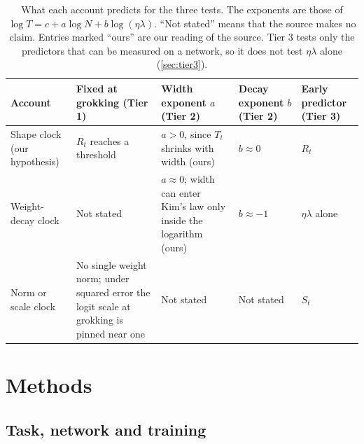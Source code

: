 \documentclass[a4paper,11pt]{article} %
\begin{document}
\begin{table}[H]
  \centering\small
  \caption{What each account predicts for the three tests. The exponents are
    those of $\log T = c + a\log N + b\log(\eta\lambda)$. \enquote{Not
    stated} means
    that the source makes no claim. Entries marked \enquote{ours} are
    our reading of
    the source. Tier 3 tests only the predictors that can be measured on a
  network, so it does not test $\eta\lambda$ alone (\cref{sec:tier3}).}
  \label{tab:predictions}
  \begin{tabular}{L{2.6cm}L{3.3cm}L{2.5cm}L{1.6cm}L{2.1cm}}
    \toprule
    Account & Fixed at grokking (Tier 1) & Width exponent $a$ (Tier 2) &
    Decay exponent $b$ (Tier 2) & Early predictor (Tier 3) \\
    \midrule
    Shape clock (our hypothesis) & $R_t$ reaches a threshold &
    $a>0$, since $T_t$ shrinks with width (ours) & $b\approx0$ & $R_t$ \\
    Weight-decay clock
    \citep{kimGrokkingWeightDecayClock2026,pracherSpectralTheoryGrokking2026,liuOmnigrokGrokkingAlgorithmic2023}
    &
    Not stated & $a\approx0$; width can enter Kim's law only inside the
    logarithm (ours) & $b\approx-1$ & $\eta\lambda$ alone \\
    Norm or scale clock
    \citep{khanhWeightNormSets2026,khanhWhatDoesWeight2026} & No single weight
    norm; under squared error the logit scale at grokking is pinned near one &
    Not stated & Not stated & $S_t$ \\
    \bottomrule
  \end{tabular}
\end{table}


\section{Methods}\label{sec:methods}

\subsection{Task, network and training}\label{sec:setup}
\end{document}
